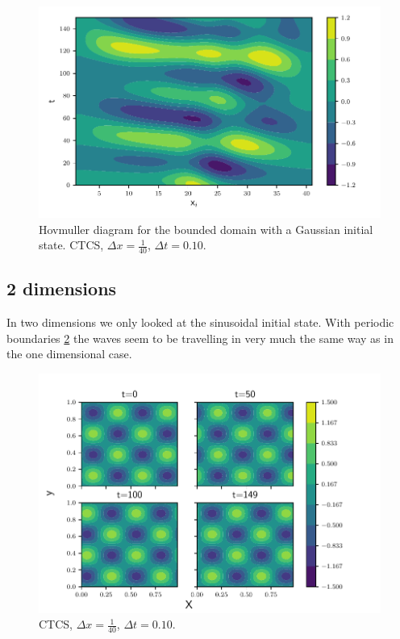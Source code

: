 \begin{figure}[htp]
  \centering
  \includegraphics[width=\textwidth]{../figures/psi_bounded_centered_gauss.pdf}
  \caption{Hovmuller diagram for the bounded domain with a Gaussian initial state. CTCS, $\Delta x = \frac{1}{40}$, $\Delta t = 0.10$.}
  \label{fig:bounded_gauss}
\end{figure}


\subsection{2 dimensions}

In two dimensions we only looked at the sinusoidal initial state.
With periodic boundaries \cref{fig:2d_periodic} the waves seem to be travelling
in very much the same way as in the one dimensional case.


\begin{figure}[htp]
  \centering
  \includegraphics[width=\textwidth]{../figures/periodic_2d.pdf}
  \caption{CTCS, $\Delta x = \frac{1}{40}$, $\Delta t = 0.10$.}
  \label{fig:2d_periodic}
\end{figure}



